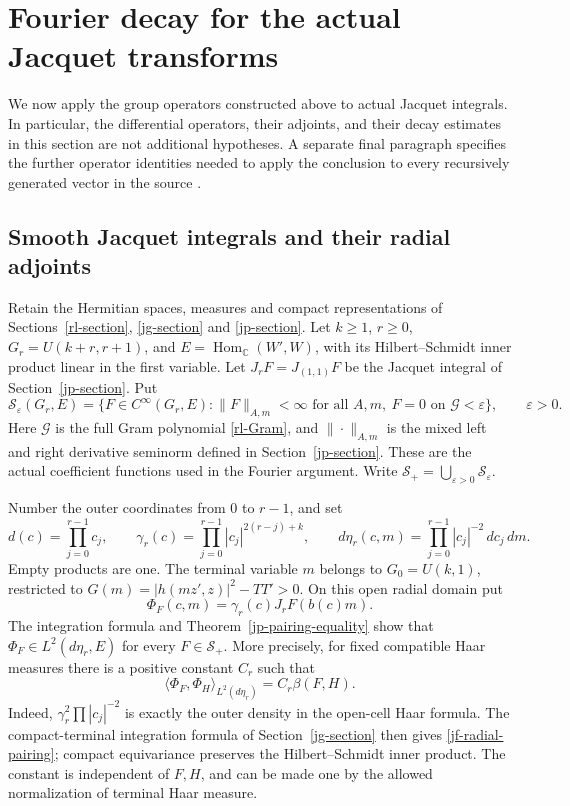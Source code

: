 \section{Fourier decay for the actual Jacquet transforms}
\label{jf-section}

We now apply the group operators constructed above to actual
Jacquet integrals.  In particular, the differential operators,
their adjoints, and their decay estimates in this section are
not additional hypotheses.  A separate final paragraph specifies
the further operator identities needed to apply the conclusion
to every recursively generated vector in the source
\cite{alpo-uniform-source}.

\subsection{Smooth Jacquet integrals and their radial adjoints}

Retain the Hermitian spaces, measures and compact representations
of Sections~\ref{rl-section}, \ref{jg-section} and
\ref{jp-section}.  Let \(k\geq1\), \(r\geq0\),
\(G_r=U(k+r,r+1)\), and
\(E=\operatorname{Hom}_{\mathbb C}(W',W)\), with its
Hilbert--Schmidt inner product linear in the first variable.
Let \(J_rF=J_{(1,1)}F\) be the Jacquet integral of
Section~\ref{jp-section}.  Put
\[
 \mathscr S_\varepsilon(G_r,E)=
 \{F\in C^\infty(G_r,E):
       \|F\|_{A,m}<\infty\text{ for all }A,m,
       \ F=0\text{ on }\mathcal G<\varepsilon\},
 \qquad \varepsilon>0.
\]
Here \(\mathcal G\) is the full Gram polynomial
\eqref{rl-Gram}, and \(\|\cdot\|_{A,m}\) is the mixed
left and right derivative seminorm defined in
Section~\ref{jp-section}.  These are the actual coefficient
functions used in the Fourier argument.  Write
\(\mathscr S_+=\bigcup_{\varepsilon>0}\mathscr S_\varepsilon\).

Number the outer coordinates from \(0\) to \(r-1\), and set
\[
 d(c)=\prod_{j=0}^{r-1}c_j,\qquad
 \gamma_r(c)=\prod_{j=0}^{r-1}|c_j|^{2(r-j)+k},\qquad
 d\eta_r(c,m)=\prod_{j=0}^{r-1}|c_j|^{-2}\,dc_j\,dm.
\]
Empty products are one.  The terminal variable \(m\) belongs
to \(G_0=U(k,1)\), restricted to
\(G(m)=|h(mz',z)|^2-TT'>0\).  On this open radial domain put
\begin{equation}\label{jf-radial-transform}
 \Phi_F(c,m)=\gamma_r(c)J_rF(b(c)m).
\end{equation}
The integration formula and Theorem~\ref{jp-pairing-equality}
show that \(\Phi_F\in L^2(d\eta_r,E)\) for every
\(F\in\mathscr S_+\).  More precisely, for fixed compatible
Haar measures there is a positive constant \(C_r\) such that
\begin{equation}\label{jf-radial-pairing}
 \langle\Phi_F,\Phi_H\rangle_{L^2(d\eta_r)}
                          =C_r\beta(F,H).
\end{equation}
Indeed, \(\gamma_r^2\prod|c_j|^{-2}\) is exactly the outer
density in the open-cell Haar formula.  The compact-terminal
integration formula of Section~\ref{jg-section} then gives
\eqref{jf-radial-pairing}; compact equivariance preserves the
Hilbert--Schmidt inner product.  The constant is independent
of \(F,H\), and can be made one by the allowed normalization
of terminal Haar measure.

